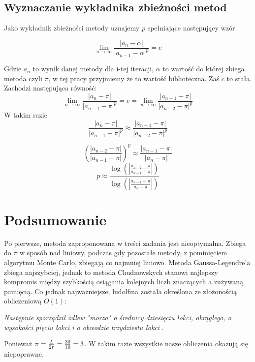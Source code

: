 \documentclass[11pt, wide, leqno]{mwart}
\begin{document}
\subsection{Wyznaczanie wykładnika zbieżności metod}

Jako wykładnik zbieżności metody uznajemy $p$ spełniające następujący wzór \cite{bog}

\[\lim_{n \to \infty} \frac{|a_n - \alpha|}{|a_{n-1} - \alpha|^p} = c  \]

Gdzie $a_n$ to wynik danej metody dla i-tej iteracji, $\alpha$ to wartość do której zbiega metoda czyli $\pi$, w tej pracy przyjmiemy że to wartość biblioteczna. Zaś $c$ to stała. Zachodzi następująca równość:
\[ \lim_{n \to \infty} \frac{|a_n - \pi|}{|a_{n-1} - \pi|^p} = c = \lim_{n \to \infty} \frac{|a_{n-1} - \pi|}{|a_{n-2} - \pi|^p} \]
W takim razie 
\[ \frac{|a_n - \pi|}{|a_{n-1} - \pi|^p} \approx \frac{|a_{n-1} - \pi|}{|a_{n-2} - \pi|^p} \]

\[ (\frac{|a_{n-2} - \pi|}{|a_{n-1} - \pi|})^p \approx \frac{|a_{n-1} - \pi|}{|a_{n} - \pi|} \]
\[ p \approx \frac{\log(|\frac{a_{n-2} - \pi}{a_{n-1} - \pi}|)}{\log(|\frac{a_{n-1} - \pi}{a_{n} - \pi}|)}
\]









\newpage

\section{Podsumowanie}

Po pierwsze, metoda zaproponowana w treści zadania jest nieoptymalna. Zbiega do $\pi$ w sposób nad liniowy, podczas gdy pozostałe metody, z pominięciem algorytmu Monte Carlo, zbiegają co najmniej liniowo. Metoda Gaussa-Legendre'a zbiega najszybciej, jednak to metoda Chudnowskych stanowi najlepszy kompromis między szybkością osiągania kolejnych liczb znaczących a zużywaną pamięcią. Co jednak najważniejsze, ludolfina została określona ze złożonością obliczeniową $O(1)$: 

\begin{center}
    \emph{Następnie sporządził odlew "morza" o średnicy dziesięciu łokci, okrągłego, o wysokości pięciu łokci i o obwodzie trzydziestu łokci} \cite{biblia}. 
\end{center}
Ponieważ $\pi={L\over 2r}={30\over 10}=3$. W takim razie wszystkie nasze obliczenia okazują się niepoprawne.
\end{document}
